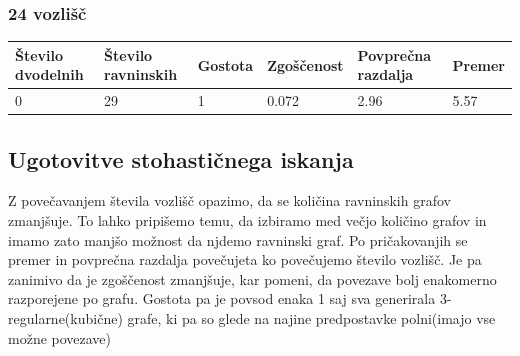 \documentclass[11pt,a4paper,titlepage]{article}
\begin{document}
\subsubsection{24 vozlišč}
\begin{table}[H]
	\begin{tabular}{|l|l|l|l|l|l|}
		\hline
		Število dvodelnih	& Število ravninskih  & Gostota  & Zgoščenost & Povprečna razdalja & Premer \\ \hline
		0 & 29  & 1 & 0.072 & 2.96 & 5.57 \\ \hline
	\end{tabular}
\end{table}

\subsection{Ugotovitve stohastičnega iskanja}
Z povečavanjem števila vozlišč opazimo, da se količina ravninskih grafov zmanjšuje. To lahko pripišemo temu, da izbiramo med večjo količino grafov in imamo zato manjšo možnost da njdemo ravninski graf. Po pričakovanjih se premer in povprečna razdalja povečujeta ko povečujemo število vozlišč. Je pa zanimivo da je zgoščenost zmanjšuje, kar pomeni, da povezave bolj enakomerno razporejene po grafu. Gostota pa je povsod enaka 1 saj sva generirala 3-regularne(kubične) grafe, ki pa so glede na najine predpostavke polni(imajo vse možne povezave)

\nocite{*}

\printbibliography
\end{document}
